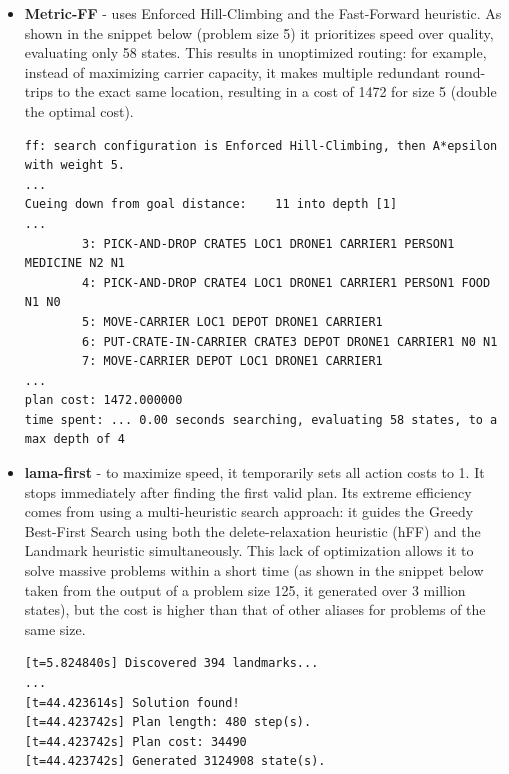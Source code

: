 \documentclass{article}
\begin{document}
\begin{itemize}
  \item \textbf{Metric-FF} - uses Enforced Hill-Climbing and the Fast-Forward heuristic. As shown in the snippet below (problem size 5) it prioritizes speed over quality, evaluating only 58 states. This results in unoptimized routing: for example, instead of maximizing carrier capacity, it makes multiple redundant round-trips to the exact same location, resulting in a cost of 1472 for size 5 (double the optimal cost).
  \begin{lstlisting}
ff: search configuration is Enforced Hill-Climbing, then A*epsilon with weight 5.
...
Cueing down from goal distance:    11 into depth [1]
...
		3: PICK-AND-DROP CRATE5 LOC1 DRONE1 CARRIER1 PERSON1 MEDICINE N2 N1
        4: PICK-AND-DROP CRATE4 LOC1 DRONE1 CARRIER1 PERSON1 FOOD N1 N0
        5: MOVE-CARRIER LOC1 DEPOT DRONE1 CARRIER1
        6: PUT-CRATE-IN-CARRIER CRATE3 DEPOT DRONE1 CARRIER1 N0 N1
        7: MOVE-CARRIER DEPOT LOC1 DRONE1 CARRIER1
...
plan cost: 1472.000000
time spent: ... 0.00 seconds searching, evaluating 58 states, to a max depth of 4
  \end{lstlisting}

 \item \textbf{lama-first} - to maximize speed, it temporarily sets all action costs to 1. It stops immediately after finding the first valid plan. Its extreme efficiency comes from using a multi-heuristic search approach: it guides the Greedy Best-First Search using both the delete-relaxation heuristic (hFF) and the Landmark heuristic simultaneously. This lack of optimization allows it to solve massive problems within a short time (as shown in the snippet below taken from the output of a problem size 125, it generated over 3 million states), but the cost is higher than that of other aliases for problems of the same size.
  \begin{lstlisting}
[t=5.824840s] Discovered 394 landmarks...
...
[t=44.423614s] Solution found!
[t=44.423742s] Plan length: 480 step(s).
[t=44.423742s] Plan cost: 34490
[t=44.423742s] Generated 3124908 state(s).
  \end{lstlisting}


\end{itemize}
\end{document}

